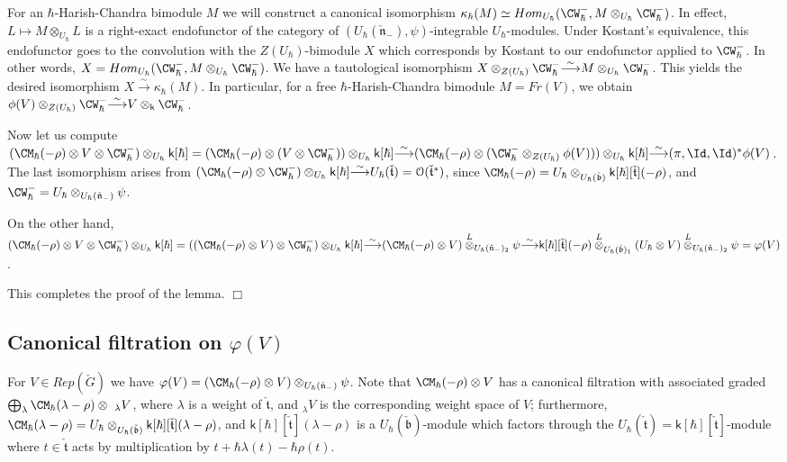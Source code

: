 \documentclass[11pt]{amsart}
\theoremstyle{definition}
\theoremstyle{remark}
\renewcommand{\O}{{\mathcal O}}
\theoremstyle{remark}
\newcommand{\cal}{\mathcal}
\newcommand{\iso}{{\stackrel{\sim}{\longrightarrow}}}
\newcommand{\<}{\langle}
\renewcommand{\>}{\rangle}
\newcommand{\Ln}{\check{\mathfrak n}{}}
\newcommand{\Lt}{\check{\mathfrak t}{}}
\newcommand{\Lb}{\check{\mathfrak b}{}}
\newcommand{\LG}{{\check{G}}}
\renewcommand{\O}{{\cal O}}
\newcommand{\kk}{\mathsf k}
\begin{document}
For an $\hbar$-Harish-Chandra bimodule $M$ we will construct a canonical
isomorphism $\kappa_\hbar(M)\simeq 
Hom_{U_\hbar}(\CW_\hbar^-,M\otimes_{U_\hbar}\CW_\hbar^-)$. In effect, 
$L\mapsto M\otimes_{U_\hbar}L$ is a right-exact endofunctor of the category of
$(U_\hbar(\Ln_-),\psi)$-integrable $U_\hbar$-modules. Under Kostant's 
equivalence, this endofunctor goes to the convolution with the 
$Z(U_\hbar)$-bimodule $X$ which corresponds by Kostant to our endofunctor
applied to $\CW_\hbar^-$. In other words, 
$X=Hom_{U_\hbar}(\CW_\hbar^-,M\otimes_{U_\hbar}\CW_\hbar^-)$.
We have a tautological isomorphism $X\otimes_{Z(U_\hbar)}\CW_\hbar^-\iso
M\otimes_{U_\hbar}\CW_\hbar^-$. This yields the desired isomorphism
$X\iso\kappa_\hbar(M)$. In particular, for a free $\hbar$-Harish-Chandra
bimodule $M=Fr(V)$, we obtain $\phi(V)\otimes_{Z(U_\hbar)}\CW_\hbar^-\iso
V\otimes_{\kk}\CW_\hbar^-$.

Now let us compute 
$(\CM_\hbar(-\rho)\otimes V\otimes \CW_\hbar^-)\otimes_{U_\hbar}
\kk[\hbar]=
(\CM_\hbar(-\rho)\otimes(V\otimes \CW_\hbar^-))\otimes_{U_\hbar}\kk[\hbar]\iso
(\CM_\hbar(-\rho)\otimes(\CW_\hbar^-\otimes_{Z(U_\hbar)}\phi(V)))
\otimes_{U_\hbar}\kk[\hbar]\iso(\pi,\Id,\Id)^*\phi(V)$. The last isomorphism
arises from $(\CM_\hbar(-\rho)
\otimes\CW_\hbar^-)\otimes_{U_\hbar}\kk[\hbar]\iso
U_\hbar(\Lt)=\O(\Lt^*)$, since 
$\CM_\hbar(-\rho)=U_\hbar\otimes_{U_\hbar(\Lb)}
\kk[\hbar][\Lt](-\rho)$, and $\CW_\hbar^-=U_\hbar\otimes_{U_\hbar(\Ln_-)}\psi$.

On the other hand, 
$(\CM_\hbar(-\rho)\otimes V\otimes \CW_\hbar^-)\otimes_{U_\hbar}
\kk[\hbar]=
((\CM_\hbar(-\rho)\otimes V)\otimes \CW_\hbar^-)
\otimes_{U_\hbar}\kk[\hbar]\iso
(\CM_\hbar(-\rho)\otimes V)\overset{L}{\otimes}_{U_\hbar(\Ln_-)_2}\psi\iso
\kk[\hbar][\Lt](-\rho)\overset{L}{\otimes}_{U_\hbar(\Lb)_1}(U_\hbar\otimes V)
\overset{L}{\otimes}_{U_\hbar(\Ln_-)_2}\psi=\varphi(V)$.

This completes the proof of the lemma.
\hfill $\Box$

\subsection{Canonical filtration on $\varphi(V)$}
\label{canon}
For $V\in Rep(\LG)$ we have $\varphi(V)=(\CM_\hbar(-\rho)\otimes V)
\otimes_{U_\hbar(\Ln_-)}\psi$. Note that $\CM_\hbar(-\rho)\otimes V$ has a
canonical filtration with associated graded 
$\bigoplus_\lambda\CM_\hbar(\lambda-\rho)\otimes\ _\lambda V$, where
$\lambda$ is a weight of $\Lt$, and $_\lambda V$ is the corresponding
weight space of $V$; furthermore,
$\CM_\hbar(\lambda-\rho)=
U_\hbar\otimes_{U_\hbar(\Lb)}\kk[\hbar][\Lt](\lambda-\rho)$,
and $\kk[\hbar][\Lt](\lambda-\rho)$ is a $U_\hbar(\Lb)$-module which factors
through the $U_\hbar(\Lt)=\kk[\hbar][\Lt]$-module where $t\in\Lt$ acts by
multiplication by $t+\hbar\lambda(t)-\hbar\rho(t)$.
\end{document}
